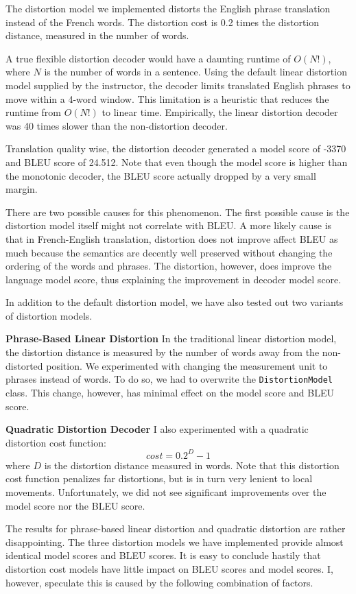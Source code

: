 \documentclass[12pt]{article}   %
\begin{document}
The distortion model we implemented distorts the English phrase translation instead of the French words. The distortion cost is 0.2 times the distortion distance, measured in the number of words.

A true flexible distortion decoder would have a daunting runtime of $O(N!)$, where $N$ is the number of words in a sentence. Using the default linear distortion model supplied by the instructor, the decoder limits translated English phrases to move within a 4-word window. This limitation is a heuristic that reduces the runtime from $O(N!)$ to linear time. Empirically, the linear distortion decoder was 40 times slower than the non-distortion decoder.

Translation quality wise, the distortion decoder generated a model score of -3370 and BLEU score of 24.512. Note that even though the model score is higher than the monotonic decoder, the BLEU score actually dropped by a very small margin. 

There are two possible causes for this phenomenon. The first possible cause is the distortion model itself might not correlate with BLEU. A more likely cause is that in French-English translation, distortion does not improve affect BLEU as much because the semantics are decently well preserved without changing the ordering of the words and phrases. The distortion, however, does improve the language model score, thus explaining the improvement in decoder model score.

In addition to the default distortion model, we have also tested out two variants of distortion models.

\textbf{Phrase-Based Linear Distortion}
In the traditional linear distortion model, the distortion distance is measured by the number of words away from the non-distorted position. We experimented with changing the measurement unit to phrases instead of words. To do so, we had to overwrite the \verb!DistortionModel! class. This change, however, has minimal effect on the model score and BLEU score.

\textbf{Quadratic Distortion Decoder}
I also experimented with a quadratic distortion cost function: $$cost = 0.2^D - 1$$ where $D$ is the distortion distance measured in words. Note that this distortion cost function penalizes far distortions, but is in turn very lenient to local movements. Unfortunately, we did not see significant improvements over the model score nor the BLEU score. 

The results for phrase-based linear distortion and quadratic distortion are rather disappointing. The three distortion models we have implemented provide almost identical model scores and BLEU scores. It is easy to conclude hastily that distortion cost models have little impact on BLEU scores and model scores. I, however, speculate this is caused by the following combination of factors.
\end{document}
